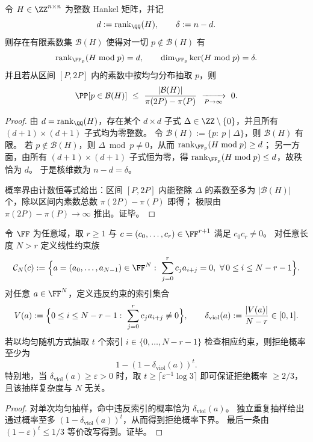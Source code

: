

\begin{proposition}[一次模素数秩审计的缺口恢复与失败概率]\label{prop:xi-hankel-defect-single-prime-rank-audit}
令 \(H\in\ZZ^{n\times n}\) 为整数 Hankel 矩阵，并记
\[
d:=\mathrm{rank}_{\QQ}(H),
\qquad
\delta:=n-d.
\]
则存在有限素数集 \(\mathcal B(H)\) 使得对一切 \(p\notin\mathcal B(H)\) 有
\[
\mathrm{rank}_{\FF_p}(H\bmod p)=d,
\qquad
\dim_{\FF_p}\ker(H\bmod p)=\delta.
\]
并且若从区间 \([P,2P]\) 内的素数中按均匀分布抽取 \(p\)，则
\[
\PP[p\in\mathcal B(H)]
\ \le\
\frac{|\mathcal B(H)|}{\pi(2P)-\pi(P)}
\ \xrightarrow[P\to\infty]{}\ 0.
\]
\end{proposition}

\begin{proof}
由 \(d=\mathrm{rank}_{\QQ}(H)\)，存在某个 \(d\times d\) 子式 \(\Delta\in\ZZ\setminus\{0\}\)，并且所有 \((d+1)\times(d+1)\) 子式均为零整数。
令
\(
\mathcal B(H):=\{p:\ p\mid \Delta\}
\)，则 \(\mathcal B(H)\) 有限。
若 \(p\notin\mathcal B(H)\)，则 \(\Delta\bmod p\neq 0\)，从而 \(\mathrm{rank}_{\FF_p}(H\bmod p)\ge d\)；
另一方面，由所有 \((d+1)\times(d+1)\) 子式恒为零，得 \(\mathrm{rank}_{\FF_p}(H\bmod p)\le d\)，故秩恰为 \(d\)。
于是核维数为 \(n-d=\delta\)。
\par
概率界由计数恒等式给出：区间 \([P,2P]\) 内能整除 \(\Delta\) 的素数至多为 \(|\mathcal B(H)|\) 个，除以区间内素数总数 \(\pi(2P)-\pi(P)\) 即得；
极限由 \(\pi(2P)-\pi(P)\to\infty\) 推出。证毕。
\end{proof}

\begin{proposition}[线性递推约束的局部核验与拒绝率下界（按违反率）]\label{prop:xi-linear-recurrence-local-test-by-violation-rate}
令 \(\FF\) 为任意域，取 \(r\ge 1\) 与 \(c=(c_0,\dots,c_r)\in\FF^{r+1}\) 满足 \(c_0c_r\neq 0\)。
对任意长度 \(N>r\) 定义线性约束族
\[
\mathcal C_N(c):=\Bigl\{a=(a_0,\dots,a_{N-1})\in\FF^N:\ \sum_{j=0}^r c_j a_{i+j}=0,\ \forall\,0\le i\le N-r-1\Bigr\}.
\]
对任意 \(a\in\FF^N\)，定义违反约束的索引集合
\[
V(a):=\Bigl\{0\le i\le N-r-1:\ \sum_{j=0}^r c_j a_{i+j}\ne 0\Bigr\},
\qquad
\delta_{\mathrm{viol}}(a):=\frac{|V(a)|}{N-r}\in[0,1].
\]
若以均匀随机方式抽取 \(t\) 个索引 \(i\in\{0,\dots,N-r-1\}\) 检查相应约束，则拒绝概率至少为
\[
1-(1-\delta_{\mathrm{viol}}(a))^t.
\]
特别地，当 \(\delta_{\mathrm{viol}}(a)\ge\varepsilon>0\) 时，取
\(
t\ge \lceil \varepsilon^{-1}\log 3\rceil
\)
即可保证拒绝概率 \(\ge 2/3\)，且该抽样复杂度与 \(N\) 无关。
\end{proposition}
\begin{proof}
对单次均匀抽样，命中违反索引的概率恰为 \(\delta_{\mathrm{viol}}(a)\)。
独立重复抽样给出通过概率至多 \((1-\delta_{\mathrm{viol}}(a))^t\)，从而得到拒绝概率下界。
最后一条由 \((1-\varepsilon)^t\le 1/3\) 等价改写得到。证毕。
\end{proof}

